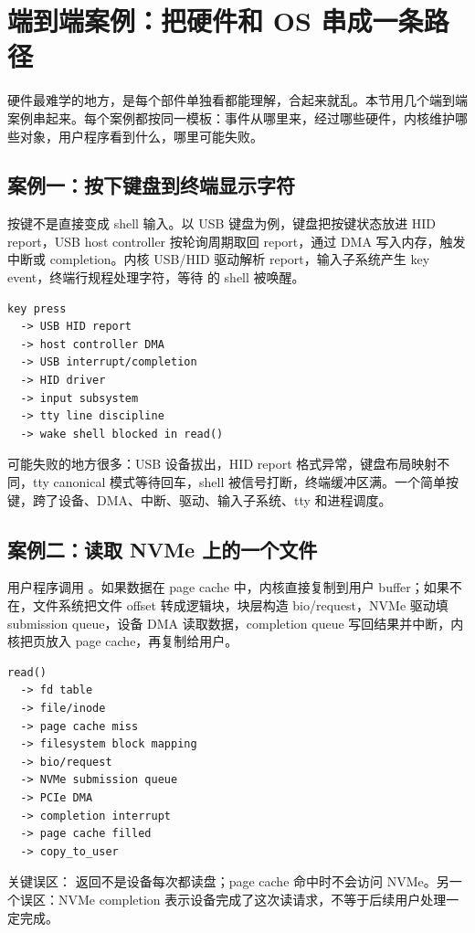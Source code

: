 \section{端到端案例：把硬件和 OS 串成一条路径}

硬件最难学的地方，是每个部件单独看都能理解，合起来就乱。本节用几个端到端案例串起来。每个案例都按同一模板：事件从哪里来，经过哪些硬件，内核维护哪些对象，用户程序看到什么，哪里可能失败。

\subsection{案例一：按下键盘到终端显示字符}

按键不是直接变成 shell 输入。以 USB 键盘为例，键盘把按键状态放进 HID report，USB host controller 按轮询周期取回 report，通过 DMA 写入内存，触发中断或 completion。内核 USB/HID 驱动解析 report，输入子系统产生 key event，终端行规程处理字符，等待  的 shell 被唤醒。

\begin{lstlisting}
key press
  -> USB HID report
  -> host controller DMA
  -> USB interrupt/completion
  -> HID driver
  -> input subsystem
  -> tty line discipline
  -> wake shell blocked in read()
\end{lstlisting}

可能失败的地方很多：USB 设备拔出，HID report 格式异常，键盘布局映射不同，tty canonical 模式等待回车，shell 被信号打断，终端缓冲区满。一个简单按键，跨了设备、DMA、中断、驱动、输入子系统、tty 和进程调度。

\subsection{案例二：读取 NVMe 上的一个文件}

用户程序调用 。如果数据在 page cache 中，内核直接复制到用户 buffer；如果不在，文件系统把文件 offset 转成逻辑块，块层构造 bio/request，NVMe 驱动填 submission queue，设备 DMA 读取数据，completion queue 写回结果并中断，内核把页放入 page cache，再复制给用户。

\begin{lstlisting}
read()
  -> fd table
  -> file/inode
  -> page cache miss
  -> filesystem block mapping
  -> bio/request
  -> NVMe submission queue
  -> PCIe DMA
  -> completion interrupt
  -> page cache filled
  -> copy_to_user
\end{lstlisting}

关键误区： 返回不是设备每次都读盘；page cache 命中时不会访问 NVMe。另一个误区：NVMe completion 表示设备完成了这次读请求，不等于后续用户处理一定完成。

